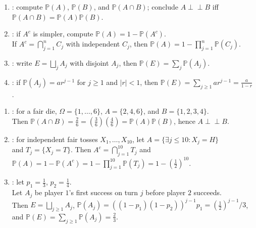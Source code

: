 \begin{method} \label{meth:independence-complement-disjoint-decomposition} 
\begin{enumerate}[label=(\roman*)]
\setlength{\itemsep}{0pt}
\item {}: compute $\mathbb{P}(A)$, $\mathbb{P}(B)$, and $\mathbb{P}(A\cap B)$; conclude $A\perp\!\!\!\perp B$ iff $\mathbb{P}(A\cap B)=\mathbb{P}(A)\mathbb{P}(B)$.
\item {}: if $A^c$ is simpler, compute $\mathbb{P}(A)=1-\mathbb{P}(A^c)$.\\
If $A^c=\bigcap\limits_{j=1}^{n}C_j$ with independent $C_j$, then $\mathbb{P}(A)=1-\prod\limits_{j=1}^{n}\mathbb{P}(C_j)$.
\item {}: write $E=\bigsqcup\limits_jA_j$ with disjoint $A_j$, then $\mathbb{P}(E)=\sum\limits_j\mathbb{P}(A_j)$.
\item {}: if $\mathbb{P}(A_j)=ar^{j-1}$ for $j\geq1$ and $|r|<1$, then $\mathbb{P}(E)=\sum\limits_{j\geq1}ar^{j-1}=\frac{a}{1-r}$.
\end{enumerate}
\end{method}

\begin{example} \label{ex:independence-complement-first-success-examples} 
\begin{enumerate}[label=(\roman*)]
\setlength{\itemsep}{0pt}
\item {}: for a fair die, $\Omega=\{1,\ldots,6\}$, $A=\{2,4,6\}$, and $B=\{1,2,3,4\}$.\\
Then $\mathbb{P}(A\cap B)=\frac{2}{6}=(\frac{3}{6})(\frac{4}{6})=\mathbb{P}(A)\mathbb{P}(B)$, hence $A\perp\!\!\!\perp B$.
\item {}: for independent fair tosses $X_1,\ldots,X_{10}$, let $A=\{\exists j\leq10:X_j=H\}$\\
and $T_j=\{X_j=T\}$. Then $A^c=\bigcap\limits_{j=1}^{10}T_j$ and $\mathbb{P}(A)=1-\mathbb{P}(A^c)=1-\prod\limits_{j=1}^{10}\mathbb{P}(T_j)=1-(\frac{1}{2})^{10}$.
\item {}: let $p_1=\frac{1}{3}$, $p_2=\frac{1}{4}$.\\
Let $A_j$ be player $1$'s first success on turn $j$ before player $2$ succeeds.\\
Then $E=\bigsqcup\limits_{j\geq1}A_j$, $\mathbb{P}(A_j)=((1-p_1)(1-p_2))^{j-1}p_1=(\frac{1}{2})^{j-1}/3$, and $\mathbb{P}(E)=\sum\limits_{j\geq1}\mathbb{P}(A_j)=\frac{2}{3}$.
\end{enumerate}
\end{example}

